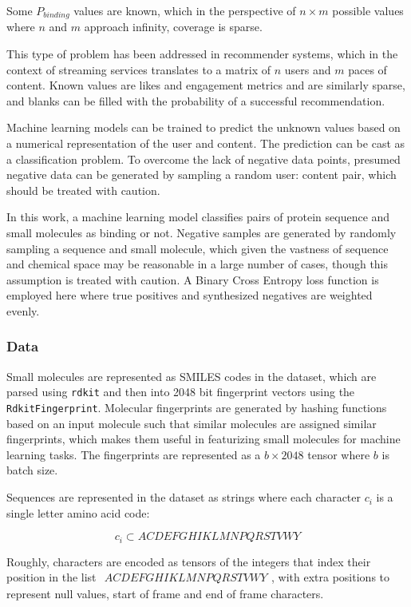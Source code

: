 \documentclass[16pt]{book}
\begin{document}
Some $P_{binding}$ values are known, which in the perspective of $n \times m$ possible values where $n$ and $m$ approach infinity, coverage is sparse.

This type of problem has been addressed in recommender systems, which in the context of streaming services translates to a matrix of $n$ users and $m$ paces of content.
Known values are likes and engagement metrics and are similarly sparse, and blanks can be filled with the probability of a successful recommendation.

Machine learning models can be trained to predict the unknown values based on a numerical representation of the user and content.
The prediction can be cast as a classification problem.
To overcome the lack of negative data points, presumed negative data can be generated by sampling a random user: content pair, which should be treated with caution.

In this work, a machine learning model classifies pairs of protein sequence and small molecules as binding or not.
Negative samples are generated by randomly sampling a sequence and small molecule, which given the vastness of sequence and chemical space may be reasonable in a large number of cases, though this assumption is treated with caution.
A Binary Cross Entropy loss function is employed here where true positives and synthesized negatives are weighted evenly.

\subsubsection{Data}

Small molecules are represented as SMILES codes in the dataset, which are parsed using \texttt{rdkit} and then into 2048 bit fingerprint vectors using the \texttt{RdkitFingerprint}.
Molecular fingerprints are generated by hashing functions based on an input molecule such that similar molecules are assigned similar fingerprints, which makes them useful in featurizing small molecules for machine learning tasks.
The fingerprints are represented as a $b \times 2048$ tensor where $b$ is batch size.

Sequences are represented in the dataset as strings where each character $c_i$ is a single letter amino acid code:

$$
c_i \subset{ACDEFGHIKLMNPQRSTVWY}
$$

Roughly, characters are encoded as tensors of the integers that index their position in the list $\begin{matrix} ACDEFGHIKLMNPQRSTVWY\end{matrix}$, with extra positions to represent null values, start of frame and end of frame characters.
\end{document}
